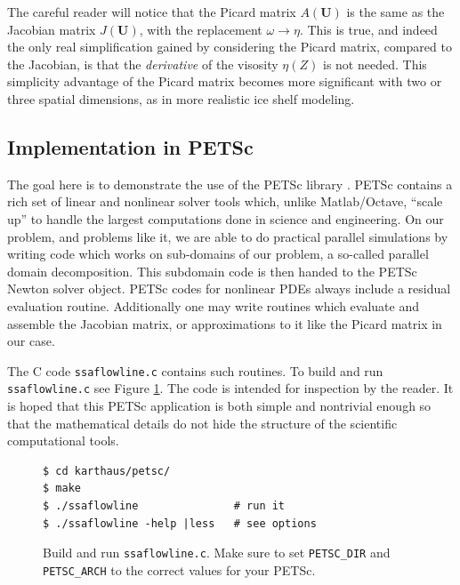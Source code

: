 \documentclass[11pt,final,reqno]{amsart}
\newcommand{\bU}{\mathbf{U}}
\begin{document}
The careful reader will notice that the Picard matrix $A(\bU)$ is the same as the Jacobian matrix $J(\bU)$, with the replacement $\omega \to \eta$.  This is true, and indeed the only real simplification gained by considering the Picard matrix, compared to the Jacobian, is that the \emph{derivative} of the visosity $\eta(Z)$ is not needed.  This simplicity advantage of the Picard matrix becomes more significant with two or three spatial dimensions, as in more realistic ice shelf modeling.

\subsection*{Implementation in PETSc}  The goal here is to demonstrate the use of the PETSc library \cite{petsc-user-ref}.  PETSc contains a rich set of linear and nonlinear solver tools which, unlike Matlab/Octave, ``scale up'' to handle the largest computations done in science and engineering.  On our problem, and problems like it, we are able to do practical parallel simulations by writing code which works on sub-domains of our problem, a so-called parallel domain decomposition.  This subdomain code is then handed to the PETSc Newton solver object.  PETSc codes for nonlinear PDEs always include a residual evaluation routine.  Additionally one may write routines which evaluate and assemble the Jacobian matrix, or approximations to it like the Picard matrix in our case.

The C code \texttt{ssaflowline.c} contains such routines.  To build and run \texttt{ssaflowline.c} see Figure \ref{fig:buildrun}.  The code is intended for inspection by the reader.  It is hoped that this PETSc application is both simple and nontrivial enough so that the mathematical details do not hide the structure of the scientific computational tools.

\begin{figure}[ht]
\small
\begin{Verbatim}[xleftmargin=1in, frame=single]
$ cd karthaus/petsc/
$ make
$ ./ssaflowline               # run it
$ ./ssaflowline -help |less   # see options
\end{Verbatim}
\normalsize
\caption{Build and run \texttt{ssaflowline.c}.  Make sure to set \texttt{PETSC\_DIR} and \texttt{PETSC\_ARCH} to the correct values for your PETSc.}
\label{fig:buildrun}
\end{figure}
\end{document}
